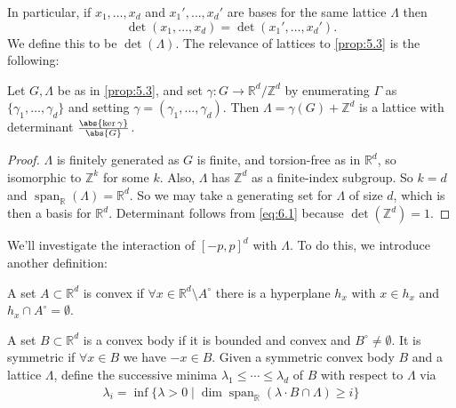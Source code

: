 \documentclass{article}
\newcommand{\ratio}[2]{\frac{\abs{#1}}{\abs{#2}}}
\DeclareMathOperator{\spn}{span}
\numberwithin{equation}{section}
\begin{document}
In particular, if $x_1, \dotsc, x_d$ and $x_1', \dotsc, x_d'$ are bases for the same lattice $\Lambda$ then
\begin{equation*}\det(x_1, \dotsc, x_d) = \det(x_1', \dotsc, x_d').\end{equation*}
We define this to be $\det(\Lambda)$.
The relevance of lattices to \cref{prop:5.3} is the following:
\begin{nlemma}\label{lem:6.1}
  Let $G,\Lambda$ be as in \cref{prop:5.3}, and set $\gamma: G \to \mathbb{R}^d/\mathbb{Z}^d$ by enumerating $\Gamma$ as $\{\gamma_1, \dotsc, \gamma_d\}$ and setting $\gamma = (\gamma_1, \dotsc, \gamma_d)$.
  Then $\Lambda = \gamma(G) + \mathbb{Z}^d$ is a lattice with determinant $\ratio{\ker \gamma}{G}$.
\end{nlemma}
\begin{proof}
  $\Lambda$ is finitely generated as $G$ is finite, and torsion-free as in $\mathbb{R}^d$, so isomorphic to $\mathbb{Z}^k$ for some $k$.
  Also, $\Lambda$ has $\mathbb{Z}^d$ as a finite-index subgroup. So $k=d$ and $\spn_\mathbb{R}(\Lambda) = \mathbb{R}^d$.
  So we may take a generating set for $\Lambda$ of size $d$, which is then a basis for $\mathbb{R}^d$. Determinant follows from \eqref{eq:6.1} because $\det(\mathbb{Z}^d) = 1$.
\end{proof}
We'll investigate the interaction of $[-p,p]^d$ with $\Lambda$. To do this, we introduce another definition:
\begin{defi}
  A set $A \subset \mathbb{R}^d$ is convex if $\forall x \in \mathbb{R}^d \setminus A^\circ$ there is a hyperplane $h_x$ with $x \in h_x$ and $h_x \cap A^\circ = \emptyset$.
\end{defi}
\begin{center}
\end{center}
\begin{defi}
  A set $B \subset \mathbb{R}^d$ is a convex body if it is bounded and convex and $B^\circ \neq \emptyset$. It is symmetric if $\forall x \in B$ we have $-x \in B$.
  Given a symmetric convex body $B$ and a lattice $\Lambda$, define the successive minima $\lambda_1 \leq \dotsb \leq \lambda_d$ of $B$ with respect to $\Lambda$ via
  \begin{align*}
    \lambda_i = \inf\{\lambda > 0 \mid \dim \spn_\mathbb{R}(\lambda \cdot B \cap \Lambda) \geq i\}
  \end{align*}
\end{defi}
\end{document}
